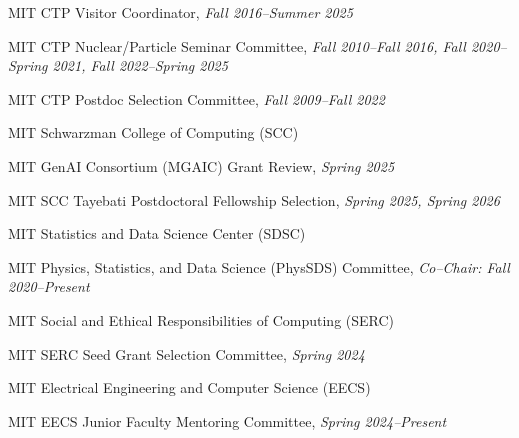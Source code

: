 \item MIT CTP Visitor Coordinator, \emph{Fall 2016--Summer 2025}
\item MIT CTP Nuclear/Particle Seminar Committee, \emph{Fall 2010--Fall 2016, Fall 2020--Spring 2021, Fall 2022--Spring 2025}
\item MIT CTP Postdoc Selection Committee, \emph{Fall 2009--Fall 2022}
\el 
\item MIT Schwarzman College of Computing (SCC)
\bsbl 
\item MIT GenAI Consortium (MGAIC) Grant Review, \emph{Spring 2025}
\item MIT SCC Tayebati Postdoctoral Fellowship Selection, \emph{Spring 2025, Spring 2026}
\el 
\item MIT Statistics and Data Science Center (SDSC)
\bsbl 
\item MIT Physics, Statistics, and Data Science (PhysSDS) Committee, \emph{Co--Chair: Fall 2020--Present}
\el 
\item MIT Social and Ethical Responsibilities of Computing (SERC)
\bsbl 
\item MIT SERC Seed Grant Selection Committee, \emph{Spring 2024}
\el 
\item MIT Electrical Engineering and Computer Science (EECS)
\bsbl 
\item MIT EECS Junior Faculty Mentoring Committee, \emph{Spring 2024--Present}
\el 
\el
